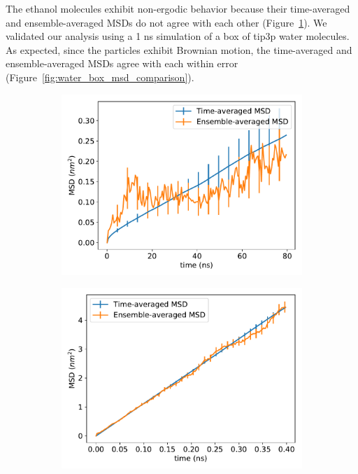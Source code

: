 \documentclass{article}
\begin{document}
  The ethanol molecules exhibit non-ergodic behavior because their
  time-averaged and ensemble-averaged MSDs do not agree with each other
  (Figure~\ref{fig:ethanol_msd_comparison}). We validated our analysis using a 1
  ns simulation of a box of tip3p water molecules. As expected, since the
  particles exhibit Brownian motion, the time-averaged and ensemble-averaged MSDs
  agree with each within error (Figure~\ref{fig:water_box_msd_comparison}).

  \begin{figure}[!htb]
  \centering
  \begin{subfigure}{0.45\textwidth}
  \includegraphics[width=\textwidth]{ethanol_msd_comparison.pdf}
  \caption{}\label{fig:ethanol_msd_comparison}
  \end{subfigure} 
  \begin{subfigure}{0.45\textwidth}
  \includegraphics[width=\textwidth]{water_box_msd_comparison.pdf}

\end{subfigure}
\end{figure}
\end{document}
